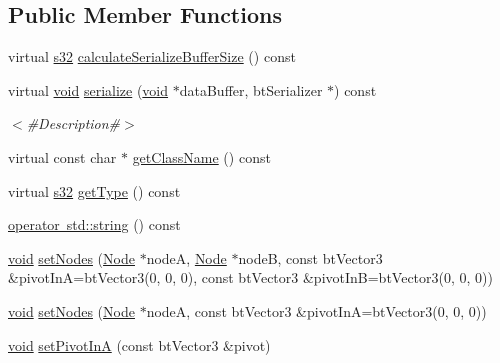 \subsection*{Public Member Functions}
\begin{DoxyCompactItemize}
\item 
virtual \mbox{\hyperlink{_util_8h_aa62c75d314a0d1f37f79c4b73b2292e2}{s32}} \mbox{\hyperlink{classnjli_1_1_physics_constraint_point_to_point_af0766c0d2de84aa206cd4fcc33b6b9ea}{calculate\+Serialize\+Buffer\+Size}} () const
\item 
virtual \mbox{\hyperlink{_thread_8h_af1e856da2e658414cb2456cb6f7ebc66}{void}} \mbox{\hyperlink{classnjli_1_1_physics_constraint_point_to_point_a9327a02aa2883e39074baf3503c2ddcc}{serialize}} (\mbox{\hyperlink{_thread_8h_af1e856da2e658414cb2456cb6f7ebc66}{void}} $\ast$data\+Buffer, bt\+Serializer $\ast$) const
\begin{DoxyCompactList}\small\item\em $<$\#\+Description\#$>$ \end{DoxyCompactList}\item 
virtual const char $\ast$ \mbox{\hyperlink{classnjli_1_1_physics_constraint_point_to_point_a98c21294338cec0671e817ff2c2afc2f}{get\+Class\+Name}} () const
\item 
virtual \mbox{\hyperlink{_util_8h_aa62c75d314a0d1f37f79c4b73b2292e2}{s32}} \mbox{\hyperlink{classnjli_1_1_physics_constraint_point_to_point_a1daae07c31eb59ee245674d465919cec}{get\+Type}} () const
\item 
\mbox{\hyperlink{classnjli_1_1_physics_constraint_point_to_point_a17b1f8d141a377f71ffeca21d6dad0f6}{operator std\+::string}} () const
\item 
\mbox{\hyperlink{_thread_8h_af1e856da2e658414cb2456cb6f7ebc66}{void}} \mbox{\hyperlink{classnjli_1_1_physics_constraint_point_to_point_af5f949ec6492fd8c96d5ae03a3aa6436}{set\+Nodes}} (\mbox{\hyperlink{classnjli_1_1_node}{Node}} $\ast$nodeA, \mbox{\hyperlink{classnjli_1_1_node}{Node}} $\ast$nodeB, const bt\+Vector3 \&pivot\+InA=bt\+Vector3(0, 0, 0), const bt\+Vector3 \&pivot\+InB=bt\+Vector3(0, 0, 0))
\item 
\mbox{\hyperlink{_thread_8h_af1e856da2e658414cb2456cb6f7ebc66}{void}} \mbox{\hyperlink{classnjli_1_1_physics_constraint_point_to_point_acbf07690cbef3072ee6b5c141a4d21c5}{set\+Nodes}} (\mbox{\hyperlink{classnjli_1_1_node}{Node}} $\ast$nodeA, const bt\+Vector3 \&pivot\+InA=bt\+Vector3(0, 0, 0))
\item 
\mbox{\hyperlink{_thread_8h_af1e856da2e658414cb2456cb6f7ebc66}{void}} \mbox{\hyperlink{classnjli_1_1_physics_constraint_point_to_point_a22513468676e92e523caea9e7c0e5ae7}{set\+Pivot\+InA}} (const bt\+Vector3 \&pivot)

\end{DoxyCompactItemize}
